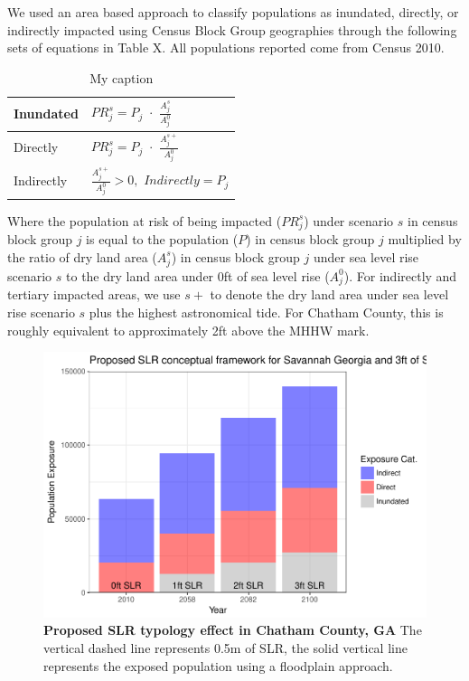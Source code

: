 \documentclass[12pt,]{article}
\makeatletter
\def\maxwidth{\ifdim\Gin@nat@width>\linewidth\linewidth
\else\Gin@nat@width\fi}
\let\Oldincludegraphics\includegraphics
\renewcommand{\includegraphics}[1]{\Oldincludegraphics[width=\maxwidth]{#1}}
\makeatother
\begin{document}
We used an area based approach \citep{hauer2016millions} to classify
populations as inundated, directly, or indirectly impacted using Census
Block Group geographies through the following sets of equations in Table
X. All populations reported come from Census 2010.

\begin{table}
\centering
\caption{My caption}
\label{my-label}
\begin{tabular}{|l|l|}
\hline
Inundated  & $PR_j^s=P_j \,\, \cdot \,\, \frac{A_j^s}{A_j^0}$ \\ \hline
Directly   & $PR_j^s=P_j \,\, \cdot \,\, \frac{A_j^{s+}}{A_j^0}$ \\ \hline
Indirectly & $\frac{A_j^{s+}}{A_j^0}>0,\,\, Indirectly=P_j$    \\ \hline
\end{tabular}
\end{table}

Where the population at risk of being impacted (\(PR_j^s\)) under
scenario \(s\) in census block group \(j\) is equal to the population
(\(P\)) in census block group \(j\) multiplied by the ratio of dry land
area (\(A_j^s\)) in census block group \(j\) under sea level rise
scenario \(s\) to the dry land area under 0ft of sea level rise
(\(A_j^0\)). For indirectly and tertiary impacted areas, we use \(s+\)
to denote the dry land area under sea level rise scenario \(s\) plus the
highest astronomical tide. For Chatham County, this is roughly
equivalent to approximately 2ft above the MHHW mark.

\begin{figure}
\centering
\includegraphics{SLR_typology_files/figure-latex/savannah-1.pdf}
\caption{\textbf{Proposed SLR typology effect in Chatham County, GA} The
vertical dashed line represents 0.5m of SLR, the solid vertical line
represents the exposed population using a floodplain approach.
\label{figure2}}
\end{figure}
\end{document}
